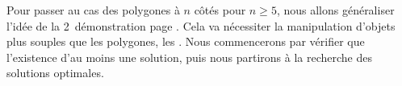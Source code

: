 Pour passer au cas des polygones à $n$ côtés pour $n \geq 5$, nous allons généraliser l'idée de la 2\ieme\ démonstration page \pageref{tri-topo-comp}. Cela va nécessiter la manipulation d'objets plus souples que les polygones, les \ncycles.
Nous commencerons par vérifier que l'existence d'au moins une solution, puis nous partirons à la recherche des solutions optimales.
